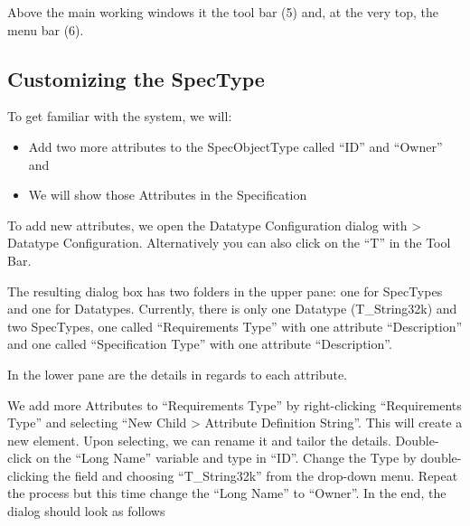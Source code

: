 Above the main working windows it the tool bar (5) and, at the very top, the menu bar (6).

\subsection{Customizing the SpecType}

To get familiar with the system, we will:

\begin{itemize}

\item
  Add two more attributes to the SpecObjectType called ``ID'' and ``Owner'' and
\item
  We will show those Attributes in the Specification
\end{itemize}

To add new attributes, we open the Datatype Configuration dialog with \pror{} \textgreater{} Datatype Configuration.  Alternatively you can also click on the ``T'' in the Tool Bar.

The resulting dialog box has two folders in the upper pane: one for SpecTypes and one for Datatypes.  Currently, there is only one Datatype (T\_String32k) and two SpecTypes, one called ``Requirements Type'' with one attribute ``Description'' and one called ``Specification Type'' with one attribute ``Description''.

In the lower pane are the details in regards to each attribute.

We add more Attributes to ``Requirements Type'' by right-clicking ``Requirements Type'' and selecting ``New Child \textgreater{} Attribute Definition String''.  This will create a new element.  Upon selecting, we can rename it and tailor the details.  Double-click on the ``Long Name'' variable and type in ``ID''.  Change the Type by double-clicking the field and choosing ``T\_String32k'' from the drop-down menu.  Repeat the process but this time change the ``Long Name'' to ``Owner''.  In the end, the dialog should look as follows

